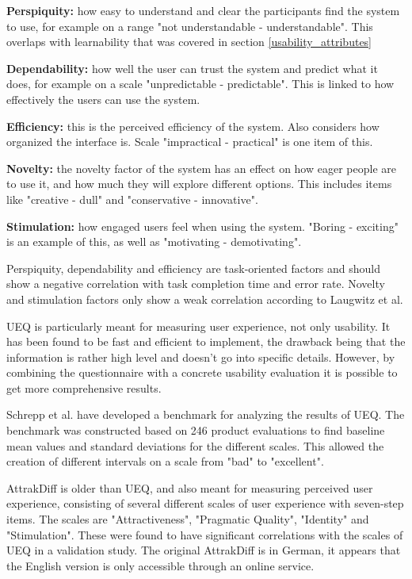 \textbf{Perspiquity:} how easy to understand and clear the participants find the system to use, for example on a range "not understandable - understandable". This overlaps with learnability that was covered in section \ref{usability_attributes}

\textbf{Dependability:} how well the user can trust the system and predict what it does, for example on a scale "unpredictable - predictable". This is linked to how effectively the users can use the system.

\textbf{Efficiency:} this is the perceived efficiency of the system. Also considers how organized the interface is. Scale "impractical - practical" is one item of this.

\textbf{Novelty:} the novelty factor of the system has an effect on how eager people are to use it, and how much they will explore different options. This includes items like "creative - dull" and "conservative - innovative".

\textbf{Stimulation:} how engaged users feel when using the system. "Boring - exciting" is an example of this, as well as "motivating - demotivating".

Perspiquity, dependability and efficiency are task-oriented factors and should show a negative correlation with task completion time and error rate. Novelty and stimulation factors only show a weak correlation according to Laugwitz et al. \cite{laugwitz2008construction}

UEQ is particularly meant for measuring user experience, not only usability. It has been found to be fast and efficient to implement, the drawback being that the information is rather high level and doesn't go into specific details. However, by combining the questionnaire with a concrete usability evaluation it is possible to get more comprehensive results. \cite{schrepp2014applying, rauschenberger2013efficient}

Schrepp et al. \cite{schrepp2017construction} have developed a benchmark for analyzing the results of UEQ. The benchmark was constructed based on 246 product evaluations to find baseline mean values and standard deviations for the different scales. This allowed the creation of different intervals on a scale from "bad" to "excellent".

AttrakDiff is older than UEQ, and also meant for measuring perceived user experience, consisting of several different scales of user experience with seven-step items. The scales are "Attractiveness", "Pragmatic Quality", "Identity" and "Stimulation". These were found to have significant correlations with the scales of UEQ in a validation study. \cite{laugwitz2008construction} The original AttrakDiff is in German, it appears that the English version is only accessible through an online service. \cite{attrakdiff}

